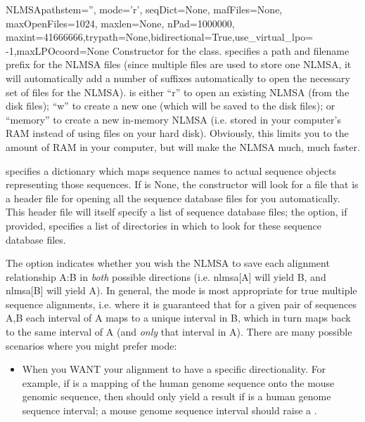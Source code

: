 \documentclass{howto}
\begin{document}
\begin{funcdesc}{NLMSA}{pathstem='', mode='r', seqDict=None, mafFiles=None, maxOpenFiles=1024, maxlen=None, nPad=1000000, maxint=41666666,trypath=None,bidirectional=True,use_virtual_lpo= -1,maxLPOcoord=None}
  Constructor for the class.   specifies a path and filename prefix for
  the NLMSA files (since multiple files are used to store one NLMSA, it will automatically add a
  number of suffixes automatically to open the necessary set of files for the NLMSA).
   is either ``r'' to open an existing NLMSA (from the  disk files); 
  ``w'' to create a new one (which will be saved to the  disk files);
  or ``memory'' to create a new in-memory NLMSA (i.e. stored in your computer's RAM
  instead of using files on your hard disk).  Obviously, this limits you to 
  the amount of RAM in your computer, but will make the NLMSA much, much faster.

   specifies a dictionary which maps sequence names to actual sequence
  objects representing those sequences.  If  is None, the constructor
  will look for a file  that is a 
  header file for opening all the sequence database files for you automatically.
  This header file will itself specify a list of sequence database files; the
   option, if provided, specifies a list of directories in which to look for these
  sequence database files.

  The  option indicates whether you wish the NLMSA to
  save each alignment relationship A:B in {\em both} possible directions
  (i.e. nlmsa[A] will yield B, and nlmsa[B] will yield A).  In general, the
   mode is most appropriate for true multiple sequence
  alignments, i.e. where it is guaranteed that for a given pair of sequences A,B
  each interval of A maps to a unique interval in B, which in turn maps back
  to the same interval of A (and {\em only} that interval in A).  There are
  many possible scenarios where you might prefer  mode:
\begin{itemize}
\item When you WANT your alignment to have a specific directionality.  For example,
if  is a mapping of the human genome sequence onto the mouse genomic
sequence, then  should only yield a result if  is a human
genome sequence interval; a mouse genome sequence interval should raise a .


\end{itemize}
\end{funcdesc}
\end{document}
